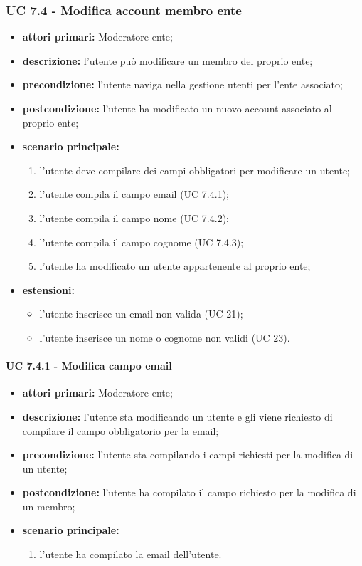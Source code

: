 			\subsubsection{UC 7.4 - Modifica account membro ente}
			\begin{itemize}
				\item \textbf{attori primari:} Moderatore ente;
				\item \textbf{descrizione:} l'utente può modificare un membro del proprio ente;
				\item \textbf{precondizione:} l'utente naviga nella gestione utenti per l'ente associato;
				\item \textbf{postcondizione:} l'utente ha modificato un nuovo account associato al proprio ente;
				\item \textbf{scenario principale:}
				\begin{enumerate}
					\item{l'utente deve compilare dei campi obbligatori per modificare un utente;}
					\item{l'utente compila il campo email (UC 7.4.1);}
					\item{l'utente compila il campo nome (UC 7.4.2);}
					\item{l'utente compila il campo cognome (UC 7.4.3);}
					\item{l'utente ha modificato un utente appartenente al proprio ente;}
				\end{enumerate}	
				\item \textbf{estensioni:}
				\begin{itemize}
					\item l'utente inserisce un email non valida (UC 21);
					\item l'utente inserisce un nome o cognome non validi (UC 23).
				\end{itemize}
			\end{itemize}
			
			\paragraph{UC 7.4.1 - Modifica campo email}
			\begin{itemize}
				\item \textbf{attori primari:} Moderatore ente;
				\item \textbf{descrizione:} l'utente sta modificando un utente e gli viene richiesto di compilare il campo obbligatorio per la email;
				\item \textbf{precondizione:} l'utente sta compilando i campi richiesti per la modifica di un utente;
				\item \textbf{postcondizione:} l'utente ha compilato il campo richiesto per la modifica di un membro;
				\item \textbf{scenario principale:}
				\begin{enumerate}
					\item{l'utente ha compilato la email dell'utente.}
				\end{enumerate}	
			\end{itemize}

